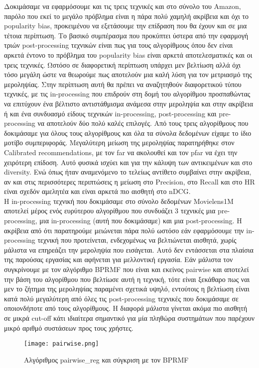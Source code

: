 \noindent Δοκιμάσαμε να εφαρμόσουμε και τις τρεις τεχνικές και στο σύνολο του Amazon, παρόλο που εκεί το μεγάλο πρόβλημα είναι η πάρα πολύ χαμηλή ακρίβεια και όχι το popularity bias, προκειμένου να εξετάσουμε την επίδραση που θα έχουν και σε μια τέτοια περίπτωση. Το βασικό συμπέρασμα που προκύπτει ύστερα από την εφαρμογή τριών post-processing τεχνικών είναι πως για τους αλγορίθμους όπου δεν είναι αρκετά έντονο το πρόβλημα του popularity bias είναι αρκετά αποτελεσματικές και οι τρεις τεχνικές. Ωστόσο σε διαφορετική περίπτωση υπάρχει μεν βελτίωση αλλά όχι τόσο μεγάλη ώστε να θεωρούμε πως αποτελούν μια καλή λύση για τον μετριασμό της μεροληψίας. Στην περίπτωση αυτή θα πρέπει να αναζητηθούν διαφορετικού τύπου τεχνικές, με τις in-processing που επιδρούν στη δομή του αλγορίθμου προσπαθώντας να επιτύχουν ένα βέλτιστο αντιστάθμισμα ανάμεσα στην μεροληψία και στην ακρίβεια ή και ένα συνδυασμό είδους τεχνικών in-processing, post-processing και pre-processing να αποτελούν δύο πολύ καλές επιλογές. Από τους τρεις αλγορίθμους που δοκιμάσαμε για όλους τους αλγορίθμους και όλα τα σύνολα δεδομένων είχαμε το ίδιο μοτίβο συμπεριφοράς. Μεγαλύτερη μείωση της μεροληψίας παρατηρήθηκε στον Calibrated recommendations, με τον far να ακολουθεί και τον pfar να έχει την χειρότερη επίδοση. Αυτό φυσικά ισχύει και για την κάλυψη των αντικειμένων και στο diversity. Ενώ όπως ήταν αναμενόμενο το τελείως αντίθετο συμβαίνει στην ακρίβεια, αν και στις περισσότερες περιπτώσεις η μείωση στο Precision, στο Recall και στο HR είναι σχεδόν αμελητέα και είναι αρκετά πιο αισθητή στο nDCG.\\
Η in-processing τεχνική που δοκιμάσαμε στο σύνολο δεδομένων Movielens1M αποτελεί μέρος ενός ευρύτερου αλγορίθμου που συνδυάζει 3 τεχνικές μια pre-processing, μια in-processing (αυτή που δοκιμάσαμε) και μια post-processing. Η ακρίβεια από ότι παρατηρούμε μειώνεται πάρα πολύ ωστόσο εάν εφαρμόσουμε την in-processing τεχνική που προτείνεται, ενδεχομένως να βελτιώνεται αισθητά, χωρίς μάλιστα να επηρεάζει την μεροληψία που εισάγεται. Αυτό δεν εντάσσεται στα πλαίσια της παρούσας εργασίας και αφήνεται για μελλοντική εργασία. Εάν μάλιστα τον συγκρίνουμε με τον αλγόριθμο BPRMF που είναι και εκείνος pairwise και αποτελεί την βάση του αλγορίθμου που βελτίωσε αυτή η τεχνική, τότε είναι ξεκάθαρο πως ναι μεν το ζήτημα της μεροληψίας παραμένει σχετικά υψηλό, εντούτοις η βελτίωση είναι κατά πολύ μεγαλύτερη από όλες τις post-processing τεχνικές που δοκιμάσαμε σε οποιονδήποτε από τους αλγορίθμους. Η διαφορά μάλιστα γίνεται ακόμα πιο αισθητή σε μικρά cut-off κάτι ιδιαίτερα σημαντικό για μία πληθώρα συστημάτων που παρέχουν μικρό αριθμό συστάσεων προς τους χρήστες. 
\begin{figure}[H]
	\centering
	\texttt{[image: pairwise.png]}
	\caption{Αλγόριθμος pairwise\_reg και σύγκριση με τον BPRMF}
	\label{fig:pair}
\end{figure}

